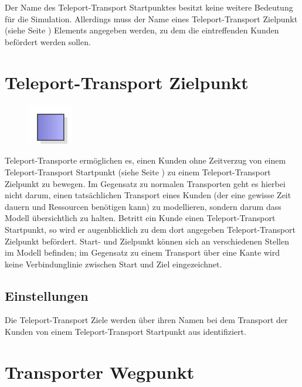 Der Name des Teleport-Transport Startpunktes besitzt keine weitere Bedeutung
für die Simulation. Allerdings muss der Name eines
Teleport-Transport Zielpunkt (siehe Seite \pageref{ref:ModelElementTeleportDestination}) 
Elements angegeben werden, zu dem die eintreffenden Kunden befördert werden sollen.


\section{Teleport-Transport Zielpunkt}
\label{ref:ModelElementTeleportDestination}

\begin{figure}
\vspace{-22pt}
\includegraphics[width=2cm]{imageModelElementTeleportDestination.png}
\vspace{-22pt}
\end{figure}

Teleport-Transporte ermöglichen es, einen Kunden ohne Zeitverzug
von einem Teleport-Transport Startpunkt (siehe Seite \pageref{ref:ModelElementTeleportSource}) 
zu einem Teleport-Transport Zielpunkt zu bewegen. Im Gegensatz zu normalen
Transporten geht es hierbei nicht darum, einen tatsächlichen Transport eines Kunden
(der eine gewisse Zeit dauern und Ressourcen benötigen kann) zu modellieren,
sondern darum dass Modell übersichtlich zu halten. Betritt ein Kunde einen
Teleport-Transport Startpunkt, so wird er augenblicklich zu dem dort angegeben
Teleport-Transport Zielpunkt befördert.
Start- und Zielpunkt können sich an verschiedenen Stellen im Modell befinden;
im Gegensatz zu einem Transport über eine Kante wird keine Verbindunglinie
zwischen Start und Ziel eingezeichnet.

\subsection*{Einstellungen}

Die Teleport-Transport Ziele werden über ihren Namen bei dem Transport der Kunden von
einem Teleport-Transport Startpunkt aus identifiziert.


\section{Transporter Wegpunkt}
\label{ref:ModelElementWayPoint}

